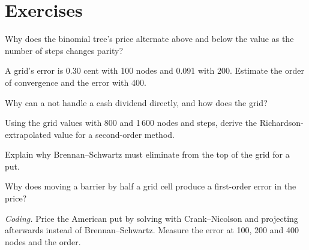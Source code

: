 \section{Exercises}

\begin{exercise}[$\star$]\label{exo:dv:trees-and-finite-difference-pricers-in-practice:1}
Why does the binomial tree's price alternate above and below the value as the number of steps changes parity?
\end{exercise}

\begin{exercise}[$\star$]\label{exo:dv:trees-and-finite-difference-pricers-in-practice:2}
A grid's error is 0.30 cent with 100 nodes and 0.091 with 200. Estimate the order of convergence and the error with 400.
\end{exercise}

\begin{exercise}[$\star$]\label{exo:dv:trees-and-finite-difference-pricers-in-practice:3}
Why can a  not handle a cash dividend directly, and how does the grid?
\end{exercise}

\begin{exercise}[$\star\star$]\label{exo:dv:trees-and-finite-difference-pricers-in-practice:4}
Using the grid values with 800 and 1\,600 nodes and steps, derive the Richardson-extrapolated value for a second-order method.
\end{exercise}

\begin{exercise}[$\star\star$]\label{exo:dv:trees-and-finite-difference-pricers-in-practice:5}
Explain why Brennan--Schwartz must eliminate from the top of the grid for a put.
\end{exercise}

\begin{exercise}[$\star\star$]\label{exo:dv:trees-and-finite-difference-pricers-in-practice:6}
Why does moving a barrier by half a grid cell produce a first-order error in the price?
\end{exercise}

\begin{exercise}[$\star\star\star$]\label{exo:dv:trees-and-finite-difference-pricers-in-practice:7}
\emph{Coding.} Price the American put by solving with Crank--Nicolson and projecting afterwards instead of Brennan--Schwartz. Measure the error at 100, 200
and 400 nodes and the order.
\end{exercise}

